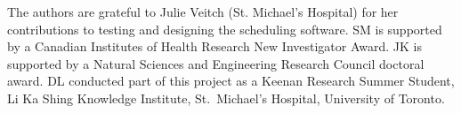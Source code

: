 The authors are grateful to Julie Veitch (St. Michael's Hospital) for her contributions to testing and
designing the scheduling software. SM is supported by a Canadian Institutes of
Health Research New Investigator Award. JK is supported by a Natural Sciences and 
Engineering Research Council doctoral award. DL conducted part of this project as a
Keenan Research Summer Student, Li Ka Shing Knowledge Institute, St.\ Michael's
Hospital, University of Toronto.
